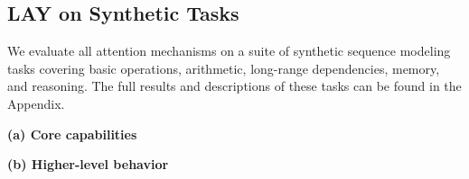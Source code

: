 \documentclass{article}
\begin{document}
\subsection{LAY on Synthetic Tasks}
\label{subsec:synthetic-experiments}

We evaluate all attention mechanisms on a suite of synthetic sequence modeling tasks
covering basic operations, arithmetic, long-range dependencies, memory, and reasoning. The full results and descriptions of these tasks can be found in the Appendix.

\begin{table}[htbp]
\centering
\small
\caption{Average accuracy by task category. The name of different methods is the same as in Fig. \ref{fig:scaling}.}
\label{tab:summary}

\textbf{(a) Core capabilities}



\vspace{0.8em}

\textbf{(b) Higher-level behavior}


\end{table}
\end{document}
